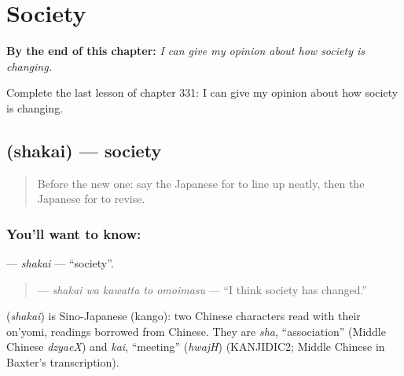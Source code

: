 
\chapter{Society}
\label{ch:ja-society}

\begin{chapteropening}
\textbf{By the end of this chapter:} \emph{I can give my opinion about how society is changing.}

Complete the last lesson of chapter 331: I can give my opinion about how society is changing.
\end{chapteropening}

\section[\texorpdfstring{\ja{しゃかい} (shakai)}{しゃかい (shakai)}]{ (shakai) — society}

\label{lesson:JA-C331-shakai}



\begin{quote}
Before the new one: say the Japanese for to line up neatly, then the Japanese for to revise.
\end{quote}

\subsection*{You'll want to know: }
\textbf{} — \emph{shakai} — \textquotedblleft{}society\textquotedblright{}.

\begin{quote}
\textbf{  } — \emph{shakai wa kawatta to omoimasu} — \textquotedblleft{}I think society has changed.\textquotedblright{}
\end{quote}

\begin{cousinweb}
\textbf{} (\emph{shakai}) is Sino-Japanese (kango): two Chinese characters read with their on'yomi, readings borrowed from Chinese. They are \emph{sha}, \textquotedblleft{}association\textquotedblright{} (Middle Chinese \emph{dzyaeX}) and \emph{kai}, \textquotedblleft{}meeting\textquotedblright{} (\emph{hwajH}) (KANJIDIC2; Middle Chinese in Baxter's transcription).
\end{cousinweb}

